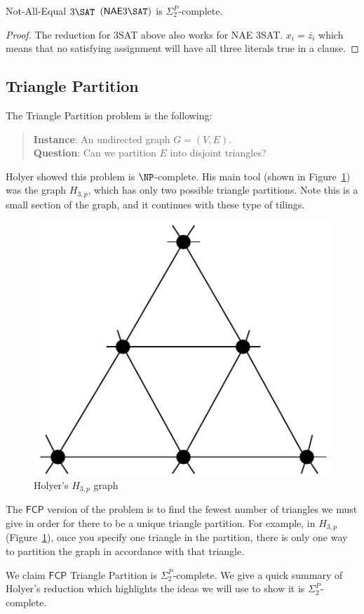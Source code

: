 \documentclass[runningheads,a4paper]{llncs}
\begin{document}
\begin{corollary}
Not-All-Equal $3\SAT$ $\mathsf{(NAE} 3\SAT\mathsf{)}$ is $\Sigma_2^P$-complete.
\end{corollary}

\begin{proof}
The reduction for 3SAT above also works for NAE 3SAT. $x_i = \overline{z_i}$ which means that no satisfying assignment will have all three literals true in a clause. 
\end{proof}

\subsection{Triangle Partition}\label{S:TP}

The Triangle Partition problem is the following:
\begin{quote}
\textbf{Instance}: An undirected graph $G = (V, E)$.\\
\textbf{Question}: Can we partition $E$ into disjoint triangles?
\end{quote}

Holyer \cite{holyer1981np} showed this problem is $\NP$-complete. His main tool (shown in Figure~\ref{fig:holyergraph}) was the graph $H_{3, p}$, which has only two possible triangle partitions. Note this is a small section of the graph, and it continues with these type of tilings.
\begin{figure}
\label{fig:holyergraph}
\centering
\includegraphics[width=0.4\linewidth]{Holyergraph.pdf}
\caption{Holyer's $H_{3,p}$ graph}
\end{figure}

The $\mathsf{FCP}$ version of the problem is to find the fewest number of triangles we must give in order for there to be a unique triangle partition. For example, in $H_{3,p}$ (Figure~\ref{fig:holyergraph}), once you specify one triangle in the partition, there is only one way to partition the graph in accordance with that triangle.

We claim $\mathsf{FCP}$ Triangle Partition is $\Sigma_2^P$-complete. We give a quick summary of Holyer's reduction which highlights the ideas we will use to show it is $\Sigma_2^P$-complete. 
\end{document}
